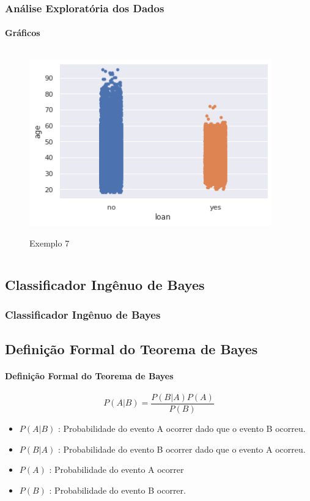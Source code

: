 \documentclass{beamer}
\begin{document}
\begin{frame}
    \frametitle{Análise Exploratória dos Dados}
    \framesubtitle{Gráficos}
    
    
    \begin{columns}
        \begin{column}{0.5\textwidth}
            \begin{figure}[h]
                \caption{Exemplo 7}
                \centering %
                \includegraphics[width=1\textwidth]{IMGS/img6.png}
                \label{figura:distidade}
            \end{figure}
        \end{column}
        \begin{column}{0.5\textwidth}

        \end{column}
        \end{columns} 
          
\end{frame}


\begin{frame}
\section{Classificador Ingênuo de Bayes}
\frametitle{Classificador Ingênuo de Bayes}
\subsection{Definição Formal do Teorema de Bayes}
\framesubtitle{Definição Formal do Teorema de Bayes}
\begin{equation}
    P(A|B) = \frac{P(B|A)P(A)}{P(B)}
\end{equation}

\begin{itemize}
\item $P(A|B)$ : Probabilidade do evento A ocorrer dado que o evento B ocorreu.
\item $P(B|A)$ : Probabilidade do evento B ocorrer dado que o evento A ocorreu.
\item $P(A)$   : Probabilidade do evento A ocorrer
\item $P(B)$   : Probabilidade do evento B ocorrer. 
\end{itemize}

\end{frame}
\end{document}
